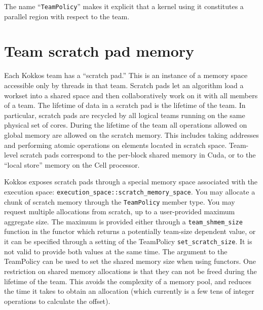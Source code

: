 The name ``\lstinline!TeamPolicy!'' makes it explicit that a kernel
using it constitutes a parallel region with respect to the team.

\section{Team scratch pad memory}\label{S:Hierarchical:Scratch}

Each Kokkos team has a ``scratch pad.''
This is an instance of a memory space accessible only by threads in that team.
Scratch pads let an algorithm load a workset into a shared space
and then collaboratively work on it with all members of a team.
The lifetime of data in a scratch pad is the lifetime of the team.
In particular, scratch pads are recycled by all logical teams running on the same physical set of cores.
During the lifetime of the team all operations allowed on global memory are allowed on the scratch memory.
This includes taking addresses and performing atomic operations on elements located in scratch space. 
Team-level scratch pads correspond to the per-block shared memory in Cuda,
or to the ``local store'' memory on the Cell processor.

Kokkos exposes scratch pads through a special memory space associated with the execution space:
\lstinline|execution_space::scratch_memory_space|.
You may allocate a chunk of scratch memory through the \lstinline|TeamPolicy| member type.
You may request multiple allocations from scratch, up to a user-provided maximum aggregate size. 
The maximum is provided either through a \lstinline|team_shmem_size| function in the functor which returns a potentially team-size dependent value, 
or it can be specified through a setting of the TeamPolicy \lstinline|set_scratch_size|. 
It is not valid to provide both values at the same time. 
The argument to the TeamPolicy can be used to set the shared memory size when using functors. 
One restriction on shared memory allocations is that they can not be freed during the lifetime of the team. 
This avoids the complexity of a memory pool,
and reduces the time it takes to obtain an allocation
(which currently is a few tens of integer operations to calculate the offset). 

